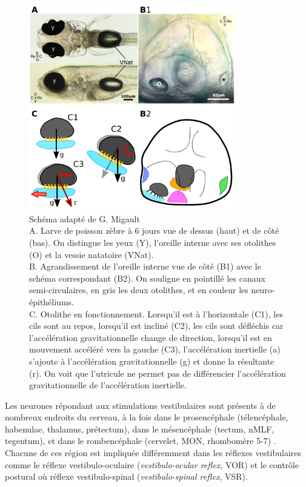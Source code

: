 \begin{figure}
\centering
\includegraphics[width=0.8\textwidth]{./files/appareil_vestibulaire.svg.png}
\caption{
Schéma adapté de G. Migault
\\
A. Larve de poisson zèbre à 6 jours vue de dessus (haut) et de côté (bas). On distingue les yeux (Y), l'oreille interne avec ses otolithes (O) et la vessie natatoire (VNat).
\\
B. Agrandissement de l'oreille interne vue de côté (B1) avec le schéma correspondant (B2). On souligne en pointillé les canaux semi-circulaires, en gris les deux otolithes, et en couleur les neuro-épithéliums.
\\
C. Otolithe en fonctionnement. Lorsqu'il est à l'horizontale (C1), les cils sont au repos, lorsqu'il est incliné (C2), les cils sont défléchis car l'accélération gravitationnelle change de direction, lorsqu'il est en mouvement accéléré vers la gauche (C3), l'accélération inertielle (a) s'ajoute à l'accélération gravitationnelle (g) et donne la résultante (r). On voit que l'utricule ne permet pas de différencier l'accélération gravitationnelle de l'accélération inertielle.}
\end{figure}

Les neurones répondant aux stimulations vestibulaires sont présents à de nombreux endroits du cerveau, à la fois dans le prosencéphale (télencéphale, habenulae, thalamus, prétectum), dans le mésencéphale (tectum, nMLF, tegentum), et dans le rombencéphale (cervelet, MON, rhombomère 5-7) \cite{favre-bulle_cellular-resolution_2018}. Chacune de ces région est impliquée différemment dans les réflexes vestibulaires comme le réflexe vestibulo-oculaire (\emph{vestibulo-ocular reflex}, VOR) et le contrôle postural où réflexe vestibulo-spinal (\emph{vestibulo-spinal reflex}, VSR).


